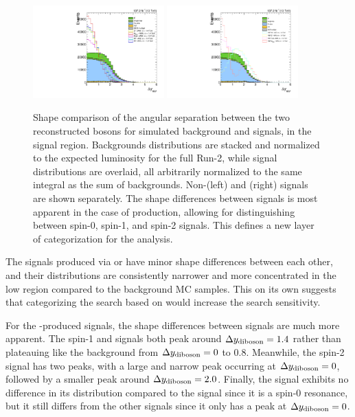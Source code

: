 \begin{figure}[htbp]
  \centering
  \includegraphics[width=0.45\textwidth]{fig/analysis/SR_b1_allL_allP_allC_inc_lo_Run2_Dy.pdf}
  \includegraphics[width=0.45\textwidth]{fig/analysis/SR_b1_allL_allP_allC_vbf_lo_Run2_Dy.pdf}\\
  \caption{
    Shape comparison of the angular separation \Dy between the two reconstructed bosons for simulated background and signals, in the signal region.
    Backgrounds distributions are stacked and normalized to the expected luminosity for the full Run-2, while signal distributions are overlaid, all arbitrarily normalized to the same integral as the sum of backgrounds.
    Non-\VBF (left) and \VBF (right) signals are shown separately.
    The shape differences between signals is most apparent in the case of \VBF production, allowing for distinguishing between spin-0, spin-1, and spin-2 signals.
    This defines a new layer of categorization for the analysis.
  }
  \label{fig:DyComp}
\end{figure}

The signals produced via \ggF or \DY have minor shape differences between each other, and their distributions are consistently narrower and more concentrated in the low \Dy region compared to the background MC samples.
This on its own suggests that categorizing the search based on \Dy would increase the search sensitivity.

For the \VBF-produced signals, the shape differences between signals are much more apparent.
The spin-1 \VBF\WprtoWZ and \ZprtoWW signals both peak around $\Delta y_\mathrm{diboson}=1.4$ rather than plateauing like the background from $\Delta y_\mathrm{diboson}=0$ to 0.8.
Meanwhile, the spin-2 \VBF\GBulktoWW signal has two peaks, with a large and narrow peak occurring at $\Delta y_\mathrm{diboson}=0$, followed by a smaller peak around $\Delta y_\mathrm{diboson}=2.0$.
Finally, the \VBF\RadtoWW signal exhibits no difference in its \Dy distribution compared to the \ggF\RadtoWW signal since it is a spin-0 resonance, but it still differs from the other \VBF signals since it only has a peak at $\Delta y_\mathrm{diboson}=0$.

